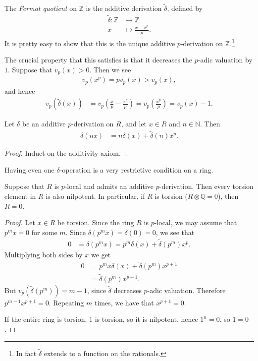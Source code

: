 \begin{example} The \textit{Fermat quotient} on $\mathbb{Z}$ is the additive derivation $\widetilde{\delta}$, defined by
\begin{align*}
    \widetilde{\delta} : \mathbb{Z} &\to \mathbb{Z} \\
    x &\mapsto \frac{x - x^p}{p}.
\end{align*}
It is pretty easy to show that this is the unique additive $p$-derivation on $\mathbb{Z}$.\footnote{In fact $\widetilde{\delta}$ extends to a function on the rationals.}
\end{example}
The crucial property that this satisfies is that it decreases the $p$-adic valuation by $1$. Suppose that $v_p(x) > 0$. Then we see
\begin{align*}
    v_p(x^p) = p v_p(x) > v_p(x),
\end{align*}
and hence
\begin{align*}
    v_p \left( \widetilde{\delta}(x) \right) &= v_p \left( \frac{x}{p} - \frac{x^p}{p} \right) = v_p \left( \frac{x^p}{p} \right) = v_p(x) -1.
\end{align*}

\begin{lemma} Let $\delta$ be an additive $p$-derivation on $R$, and let $x\in R$ and $n \in \mathbb{N}$. Then
\begin{align*}
    \delta(nx) &= n \delta(x) + \widetilde{\delta}(n)x^p.
\end{align*}
\end{lemma}
\begin{proof} Induct on the additivity axiom.
\end{proof}

Having even one $\delta$-operation is a very restrictive condition on a ring.

\begin{example} Suppose that $R$ is $p$-local and admits an additive $p$-derivation. Then every torsion element in $R$ is also nilpotent. In particular, if $R$ is torsion ($R \otimes \mathbb{Q} = 0$), then $R=0$.
\end{example}
\begin{proof} Let $x\in R$ be torsion. Since the ring $R$ is $p$-local, we may assume that $p^m x = 0$ for some $m$. Since $\delta(p^m x) = \delta(0) = 0$, we see that
\begin{align*}
    0 &= \delta(p^m x) = p^m \delta(x) + \widetilde{\delta}(p^m) x^p.
\end{align*}
Multiplying both sides by $x$ we get
\begin{align*}
    0 &= p^m x \delta(x) + \widetilde{\delta}(p^m) x^{p+1} \\
    &= \widetilde{\delta}(p^m) x^{p+1}.
\end{align*}
But $v_p(\widetilde{\delta}(p^m)) = m-1$, since $\widetilde{\delta}$ decreases $p$-adic valuation. Therefore $p^{m-1} x^{p+1} = 0$. Repeating $m$ times, we have that $x^{p+1} = 0$.

If the entire ring is torsion, 1 is torsion, so it is nilpotent, hence $1^n = 0$, so $1=0$.
\end{proof}

